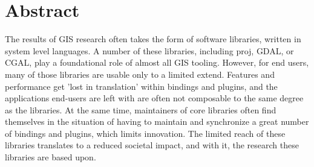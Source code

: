 \chapter*{Abstract}

The results of GIS research often takes the form of software libraries, written in system level languages. 
A number of these libraries, including  proj, GDAL, or CGAL, play a foundational role of almost all GIS tooling.
However, for end users, many of those libraries are usable only to a limited extend.
Features and performance get 'lost in translation' within bindings and plugins, and the applications end-users are left with are often not composable to the same degree as the libraries. 
At the same time, maintainers of core libraries often find themselves in the situation of having to maintain and synchronize a great number of bindings and plugins, which limits innovation.
The limited reach of these libraries translates to a reduced societal impact, and with it, the research these libraries are based upon.

